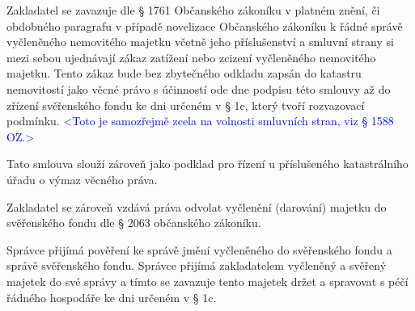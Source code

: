 \documentclass[parskip=half]{scrreprt}
\begin{document}
\begin{contract}


Zakladatel se zavazuje dle § 1761 Občanského zákoníku v platném znění, či obdobného paragrafu v případě novelizace Občanského zákoníku k řádné správě vyčleněného nemovitého majetku včetně jeho příslušenství a smluvní strany si mezi sebou ujednávají zákaz zatížení nebo zcizení vyčleněného nemovitého majetku. Tento zákaz bude bez zbytečného odkladu zapsán do katastru nemovitostí jako věcné právo s účinností ode dne podpisu této smlouvy až do zřízení svěřenského fondu ke dni určeném v § 1c, který tvoří rozvazovací podmínku. \textcolor{blue}{<Toto je samozřejmě zcela na volnosti smluvních stran, viz § 1588 OZ.>}

Tato smlouva slouží zároveň jako podklad pro řízení u příslušeného katastrálního úřadu o výmaz věcného práva.

Zakladatel se zároveň vzdává práva odvolat vyčlenění (darování) majetku do svěřenského fondu dle § 2063 občanského zákoníku.



Správce přijímá pověření ke správě jmění vyčleněného do svěřenského fondu a správě svěřenského fondu. Správce přijímá zakladatelem vyčleněný a svěřený majetek do své správy a tímto se zavazuje tento majetek držet a spravovat s péčí řádného hospodáře ke dni určeném v § 1c.


\end{contract}
\end{document}
